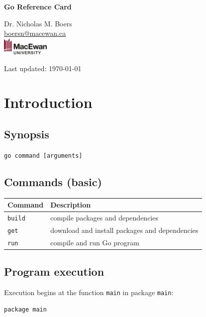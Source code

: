 \documentclass{article}
\begin{document}
\raggedright

\begin{multicols*}{3}
  \footnotesize

  \begin{center}
    {\Large{}\bfseries{}Go Reference Card}

    Dr. Nicholas M. Boers\\
    \url{boersn@macewan.ca}\\
    \vspace{0.2em}
    \includegraphics[height=0.85cm]{macewan}

    \vspace{1em}
    Last updated: \today
  \end{center}

  \filbreak
  \section*{Introduction}

  \subsection*{Synopsis}

  \texttt{go command [arguments]}

  \subsection*{Commands (basic)}

  \begin{tabular}{p{0.5in}p{2.5in}}
    \toprule
    \textbf{Command} & \textbf{Description} \\
    \midrule
    \texttt{build} & compile packages and dependencies \\
    \texttt{get} & download and install packages and dependencies \\
    \texttt{run} & compile and run Go program \\
    \bottomrule
  \end{tabular}

  \subsection*{Program execution}

  Execution begins at the function \texttt{main} in package \texttt{main}:
\begin{lstlisting}[numbers=none,escapechar=\%]
package main


\end{lstlisting}
\end{multicols*}
\end{document}
